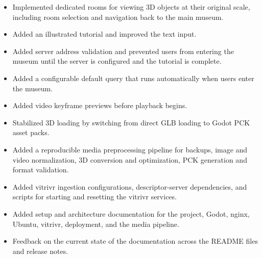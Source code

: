 \documentclass{article}
\begin{document}
\done
\begin{itemize}
    \item Implemented dedicated rooms for viewing 3D objects at their original scale, including room selection and navigation back to the main museum.
    \item Added an illustrated tutorial and improved the text input.
    \item Added server address validation and prevented users from entering the museum until the server is configured and the tutorial is complete.
    \item Added a configurable default query that runs automatically when users enter the museum.
    \item Added video keyframe previews before playback begins.
    \item Stabilized 3D loading by switching from direct GLB loading to Godot PCK asset packs.
    \item Added a reproducible media preprocessing pipeline for backups, image and video normalization, 3D conversion and optimization, PCK generation and format validation.
    \item Added vitrivr ingestion configurations, descriptor-server dependencies, and scripts for starting and resetting the vitrivr services.
    \item Added setup and architecture documentation for the project, Godot, nginx, Ubuntu, vitrivr, deployment, and the media pipeline.
\end{itemize}

\support
\begin{itemize}
    \item Feedback on the current state of the documentation across the README files and release notes.
\end{itemize}

\plan
{}
\end{document}
